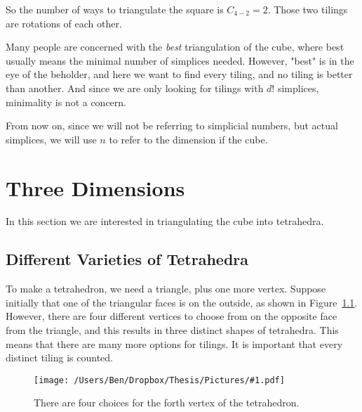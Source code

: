 \documentclass[12pt]{scrippsthesis}
\newcommand{\pic}[2]{\texttt{[image: /Users/Ben/Dropbox/Thesis/Pictures/\#1.pdf]}}
\theoremstyle{definition}
\theoremstyle{remark}
\theoremstyle{plain}
\begin{document}
So the number of ways to triangulate the square is $C_{4-2}=2$.  Those two tilings are rotations of each other.

Many people are concerned with the \emph{best} triangulation of the cube, where best usually means the minimal number of simplices needed.  However, "best" is in the eye of the beholder, and here we want to find every tiling, and no tiling is better than another.  And since we are only looking for tilings with $d!$ simplices, minimality is not a concern.

From now on, since we will not be referring to simplicial numbers, but actual simplices, we will use $n$ to refer to the dimension if the cube.




\chapter{Three Dimensions}
\label{chap: Three Dimensions}



In this section we are interested in triangulating the cube into tetrahedra.

\section{ Different Varieties of Tetrahedra }

To make a tetrahedron, we need a triangle, plus one more vertex.  Suppose initially that one of the triangular faces is on the outside, as shown in Figure~\ref{fig:triangle}.  However, there are four different vertices to choose from on the opposite face from the triangle, and this results in three distinct shapes of tetrahedra.  This means that there are many more options for tilings.  It is important that every distinct tiling is counted.

\begin{figure}[H]
\centerline{\hfill
\pic{chooseverts}{scale=.5}\hfill}
\caption{ There are four choices for the forth vertex of the tetrahedron.  }
\label{fig:triangle}
\end{figure}




\end{document}
